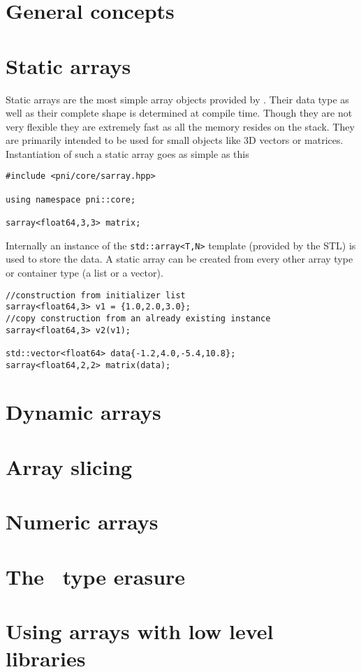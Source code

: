 
\section{General concepts}\label{sec:array:general_concepts}


\section{Static arrays}\label{sec:array:static_arrays}

Static arrays are the most simple array objects provided by \libpnicore. Their
data type as well as their complete shape is determined at compile time. Though
they are not very flexible they are extremely fast as all the memory resides on
the stack. They are primarily intended to be used for small objects like 3D
vectors or matrices. 
Instantiation of such a static array goes as simple as this
\begin{verbatim}
#include <pni/core/sarray.hpp>

using namespace pni::core;

sarray<float64,3,3> matrix;
\end{verbatim}
Internally an instance of the {\tt std::array<T,N>} template (provided by the
STL) is used to store the data. A static array can be created from every other
array type or container type (a list or a vector).

\begin{verbatim}
//construction from initializer list
sarray<float64,3> v1 = {1.0,2.0,3.0}; 
//copy construction from an already existing instance 
sarray<float64,3> v2(v1);

std::vector<float64> data{-1.2,4.0,-5.4,10.8};
sarray<float64,2,2> matrix(data);
\end{verbatim}



\section{Dynamic arrays}\label{sec:array:dynamic_arrays}

\section{Array slicing}\label{sec:array:array_slicing}

\section{Numeric arrays}\label{sec:array:numeric_arrays}

\section{The \arrayerasure\ type erasure}\label{sec:array:type_erasure}

\section{Using arrays with low level libraries}
